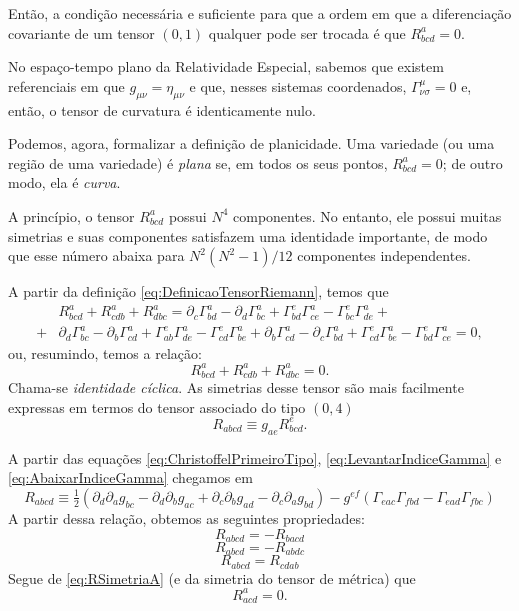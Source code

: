 Então, a condição necessária e suficiente para que a ordem em que a diferenciação covariante de um tensor $(0,1)$ qualquer pode ser trocada é que $R^a_{bcd}=0$.


No espaço-tempo plano da Relatividade Especial, sabemos que existem referenciais em que $g_{\mu\nu}=\eta_{\mu\nu}$ e que, nesses sistemas coordenados, $\Gamma^\mu_{\nu\sigma}=0$ e, então, o tensor de curvatura é identicamente nulo.

 Podemos, agora, formalizar a definição de planicidade. Uma variedade (ou uma região de uma variedade) é \textit{plana} se, em todos os seus pontos, $R^a_{bcd}=0$; de outro modo, ela é \textit{curva}. 

 A princípio, o tensor $R^a_{bcd}$ possui $N^4$ componentes. No entanto, ele possui muitas simetrias e suas componentes satisfazem uma identidade importante, de modo que esse número abaixa para $N^2(N^2-1)/12$ componentes independentes. 
 
 A partir da definição \eqref{eq:DefinicaoTensorRiemann}, temos que
\begin{align*}
	&R_{b c d}^{a}+R_{c d b}^{a}+R_{d b c}^{a}= 
	\partial_{c} \Gamma_{bd}^{a}-\partial_{d} \Gamma_{bc}^{a}+\Gamma_{bd}^{e}
	\Gamma_{ce}^{a}-\Gamma_{bc}^{e} \Gamma_{de}^{a} + \\
	+&\partial_{d} \Gamma_{bc}^{a}-\partial_{b} \Gamma_{cd}^{a}+\Gamma_{ab}^{e} \Gamma_{de}^{a}-\Gamma_{cd}^{e} \Gamma_{be}^{a} +
	\partial_{b} \Gamma_{cd}^{a}-\partial_{c} \Gamma_{bd}^{a}+\Gamma_{cd}^{e} \Gamma_{be}^{a}-\Gamma_{bd}^{e} \Gamma_{ce}^{a}=0,
\end{align*}
ou, resumindo, temos a relação:
 \begin{equation}\label{eq:IdentidadeCiclicaTensorDeCurvatura}
	 R^a_{bcd}+R^a_{cdb}+R^a_{dbc}=0.
 \end{equation}
 Chama-se \textit{identidade cíclica}. As simetrias desse tensor são mais facilmente expressas em termos do tensor associado do tipo $(0,4)$
\[
	R_{abcd} \equiv g_{ae}R^e_{bcd}.
\]

A partir das equações \eqref{eq:ChristoffelPrimeiroTipo}, \eqref{eq:LevantarIndiceGamma} e \eqref{eq:AbaixarIndiceGamma} chegamos em
\begin{equation}
	R_{a b c d} \equiv \tfrac{1}{2}\left(\partial_{d} \partial_{a} g_{b c}-\partial_{d} \partial_{b} g_{a c}+\partial_{c} \partial_{b} g_{a d}-\partial_{c} \partial_{a} g_{b d}\right)-g^{e f}\left(\Gamma_{e a c} \Gamma_{f b d}-\Gamma_{e a d} \Gamma_{f b c}\right)
\end{equation}
A partir dessa relação, obtemos as seguintes propriedades:
\begin{equation}\label{eq:RSimetriaA}
	R_{abcd}=-R_{bacd}
\end{equation}
\begin{equation}\label{eq:RSimetriaB}
	R_{abcd}=-R_{abdc}
\end{equation}
\begin{equation}\label{eq:RSimetriaC}
	R_{abcd}=R_{cdab}
\end{equation}
Segue de \eqref{eq:RSimetriaA} (e da simetria do tensor de métrica) que
\[
R^a_{acd} = 0.
\]


